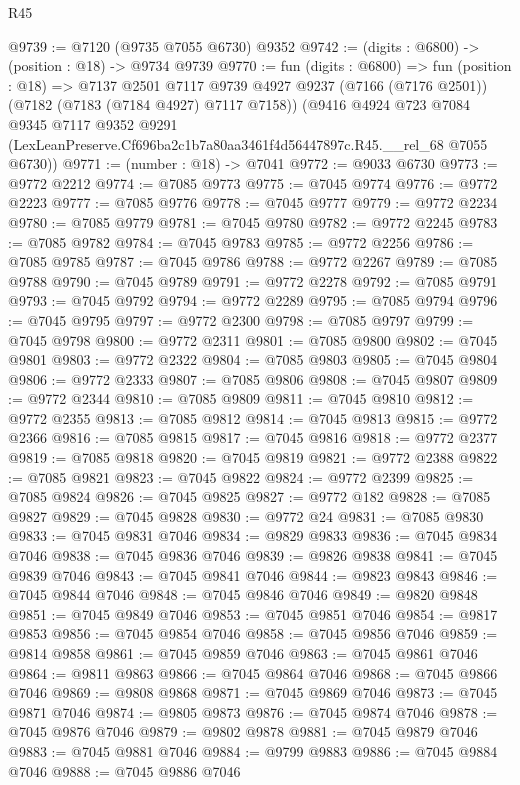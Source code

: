 \begin{lexlean}{R45}
\begin{coremodule}
{@9739 := @7120 (@9735 @7055 @6730) @9352
@9742 := (digits : @6800) -> (position : @18) -> @9734 @9739
@9770 := fun (digits : @6800) =>
  fun (position : @18) =>
  @7137
    @2501
    @7117
    @9739
    @4927
    @9237
    (@7166 (@7176 @2501))
    (@7182 (@7183 (@7184 @4927) @7117 @7158))
    (@9416
      @4924
      @723
      @7084
      @9345
      @7117
      @9352
      @9291
      (LexLeanPreserve.Cf696ba2c1b7a80aa3461f4d56447897c.R45.__rel_68 @7055 @6730))
@9771 := (number : @18) -> @7041
@9772 := @9033 @6730
@9773 := @9772 @2212
@9774 := @7085 @9773
@9775 := @7045 @9774
@9776 := @9772 @2223
@9777 := @7085 @9776
@9778 := @7045 @9777
@9779 := @9772 @2234
@9780 := @7085 @9779
@9781 := @7045 @9780
@9782 := @9772 @2245
@9783 := @7085 @9782
@9784 := @7045 @9783
@9785 := @9772 @2256
@9786 := @7085 @9785
@9787 := @7045 @9786
@9788 := @9772 @2267
@9789 := @7085 @9788
@9790 := @7045 @9789
@9791 := @9772 @2278
@9792 := @7085 @9791
@9793 := @7045 @9792
@9794 := @9772 @2289
@9795 := @7085 @9794
@9796 := @7045 @9795
@9797 := @9772 @2300
@9798 := @7085 @9797
@9799 := @7045 @9798
@9800 := @9772 @2311
@9801 := @7085 @9800
@9802 := @7045 @9801
@9803 := @9772 @2322
@9804 := @7085 @9803
@9805 := @7045 @9804
@9806 := @9772 @2333
@9807 := @7085 @9806
@9808 := @7045 @9807
@9809 := @9772 @2344
@9810 := @7085 @9809
@9811 := @7045 @9810
@9812 := @9772 @2355
@9813 := @7085 @9812
@9814 := @7045 @9813
@9815 := @9772 @2366
@9816 := @7085 @9815
@9817 := @7045 @9816
@9818 := @9772 @2377
@9819 := @7085 @9818
@9820 := @7045 @9819
@9821 := @9772 @2388
@9822 := @7085 @9821
@9823 := @7045 @9822
@9824 := @9772 @2399
@9825 := @7085 @9824
@9826 := @7045 @9825
@9827 := @9772 @182
@9828 := @7085 @9827
@9829 := @7045 @9828
@9830 := @9772 @24
@9831 := @7085 @9830
@9833 := @7045 @9831 @7046
@9834 := @9829 @9833
@9836 := @7045 @9834 @7046
@9838 := @7045 @9836 @7046
@9839 := @9826 @9838
@9841 := @7045 @9839 @7046
@9843 := @7045 @9841 @7046
@9844 := @9823 @9843
@9846 := @7045 @9844 @7046
@9848 := @7045 @9846 @7046
@9849 := @9820 @9848
@9851 := @7045 @9849 @7046
@9853 := @7045 @9851 @7046
@9854 := @9817 @9853
@9856 := @7045 @9854 @7046
@9858 := @7045 @9856 @7046
@9859 := @9814 @9858
@9861 := @7045 @9859 @7046
@9863 := @7045 @9861 @7046
@9864 := @9811 @9863
@9866 := @7045 @9864 @7046
@9868 := @7045 @9866 @7046
@9869 := @9808 @9868
@9871 := @7045 @9869 @7046
@9873 := @7045 @9871 @7046
@9874 := @9805 @9873
@9876 := @7045 @9874 @7046
@9878 := @7045 @9876 @7046
@9879 := @9802 @9878
@9881 := @7045 @9879 @7046
@9883 := @7045 @9881 @7046
@9884 := @9799 @9883
@9886 := @7045 @9884 @7046
@9888 := @7045 @9886 @7046
}
\end{coremodule}
\end{lexlean}
